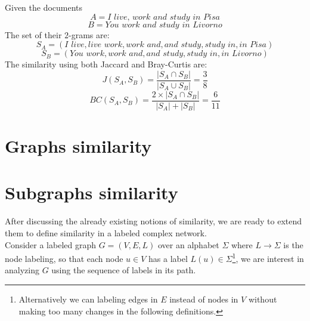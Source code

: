 \begin{esempio}
	Given the documents 
	\begin{equation*}
	A = \textit{I live, work and study in Pisa}
	\end{equation*}
	\begin{equation*}
	B = \textit{You work and study in Livorno}
	\end{equation*}
	The set of their $2$-grams are:
	\begin{equation*}
	S_{A} = (\textit{I live}, \textit{live work}, \textit{work and}, \textit{and study}, \textit{study in}, \textit{in Pisa})
	\end{equation*}
	\begin{equation*}
	S_{B} = (\textit{You work}, \textit{work and}, \textit{and study}, \textit{study in}, \textit{in Livorno})
	\end{equation*}
	The similarity using both Jaccard and Bray-Curtis are:\\
	\begin{equation*}
		J(S_{A},S_{B}) = \frac{|S_{A} \cap S_{B} |}{|S_{A} \cup S_{B} |} = \frac{3}{8}
	\end{equation*}
	\begin{equation*}
		BC(S_{A},S_{B}) = \frac{2 \times |S_{A} \cap S_{B} |}{|S_{A}| +|S_{B}|} = \frac{6}{11}
	\end{equation*}
\end{esempio}

\clearpage

\section{Graphs similarity}

\clearpage

\section{Subgraphs similarity}

After discussing the already existing notions of similarity, we are ready to extend them to define similarity in a labeled complex network.\\

Consider a labeled graph $G = (V, E, L)$ over an alphabet $\Sigma$ where $L \rightarrow \Sigma$ is the node labeling, so that each node $u \in V$ has a label $L(u) \in \Sigma$\footnote{Alternatively we can labeling edges in $E$ instead of nodes in $V$ without making too many changes in the following definitions.}, we are interest in analyzing $G$ using the sequence of labels in its path.

